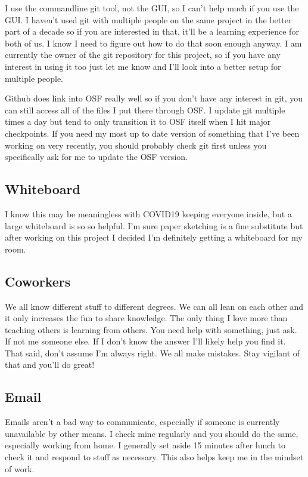 \documentclass[prb,preprint]{revtex4-1}
\begin{document}
I use the commandline git tool, not the GUI, so I can't help much if you use the GUI. I haven't used git with multiple people on the same project in the better part of a decade so if you are interested in that, it'll be a learning experience for both of us. I know I need to figure out how to do that soon enough anyway. I am currently the owner of the git repository for this project, so if you have any interest in using it too just let me know and I'll look into a better setup for multiple people.

Github does link into OSF really well so if you don't have any interest in git, you can still access all of the files I put there through OSF. I update git multiple times a day but tend to only transition it to OSF itself when I hit major checkpoints. If you need my most up to date version of something that I've been working on very recently, you should probably check git first unless you specifically ask for me to update the OSF version.

\subsection{Whiteboard}
I know this may be meaningless with COVID19 keeping everyone inside, but a large whiteboard is so so helpful. I'm sure paper sketching is a fine substitute but after working on this project I decided I'm definitely getting a whiteboard for my room.

\subsection{Coworkers}
We all know different stuff to different degrees. We can all lean on each other and it only increases the fun to share knowledge. The only thing I love more than teaching others is learning from others. You need help with something, just ask. If not me someone else. If I don't know the answer I'll likely help you find it. That said, don't assume I'm always right. We all make mistakes. Stay vigilant of that and you'll do great!

\subsection{Email}
Emails aren't a bad way to communicate, especially if someone is currently unavailable by other means. I check mine regularly and you should do the same, especially working from home. I generally set aside 15 minutes after lunch to check it and respond to stuff as necessary. This also helps keep me in the mindset of work.
\end{document}
